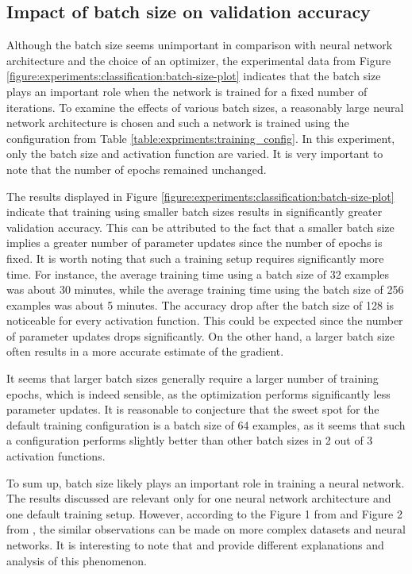 \subsection{Impact of batch size on validation accuracy}
\label{subsection:experiments:classification:batch}
Although the batch size seems unimportant in comparison with neural network architecture and the choice of an optimizer, the experimental data from Figure \ref{figure:experiments:classification:batch-size-plot} indicates that the batch size plays an important role when the network is trained for a fixed number of iterations. To examine the effects of various batch sizes, a reasonably large neural network architecture is chosen and such a network is trained using the configuration from Table \ref{table:expriments:training_config}. In this experiment, only the batch size and activation function are varied. It is very important to note that the number of epochs remained unchanged. 

The results displayed in Figure \ref{figure:experiments:classification:batch-size-plot} indicate that training using smaller batch sizes results in significantly greater validation accuracy. This can be attributed to the fact that a smaller batch size implies a greater number of parameter updates since the number of epochs is fixed. It is worth noting that such a training setup requires significantly more time. For instance, the average training time using a batch size of 32 examples was about 30 minutes, while the average training time using the batch size of 256 examples was about 5 minutes. The accuracy drop after the batch size of 128 is noticeable for every activation function. This could be expected since the number of parameter updates drops significantly. On the other hand, a larger batch size often results in a more accurate estimate of the gradient.

It seems that larger batch sizes generally require a larger number of training epochs, which is indeed sensible, as the optimization performs significantly less parameter updates. It is reasonable to conjecture that the sweet spot for the default training configuration is a batch size of 64 examples, as it seems that such a configuration performs slightly better than other batch sizes in 2 out of 3 activation functions.

To sum up, batch size likely plays an important role in training a neural network. The results discussed are relevant only for one neural network architecture and one default training setup. However, according to the Figure 1 from \cite{hoffer_2018_train} and Figure 2 from \cite{shirishkeskar_2017_on}, the similar observations can be made on more complex datasets and neural networks. It is interesting to note that \cite{hoffer_2018_train} and \cite{shirishkeskar_2017_on} provide different explanations and analysis of this phenomenon.


